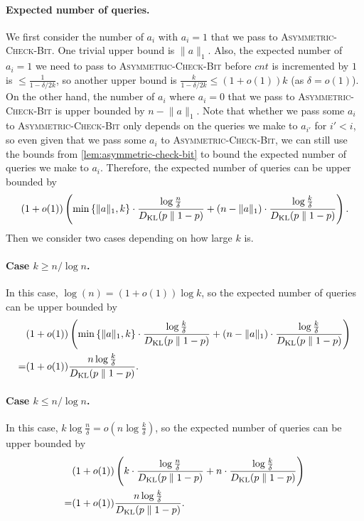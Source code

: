 \paragraph{Expected number of queries.} We first consider the number of $a_i$ with $a_i = 1$ that we pass to \textsc{Asymmetric-Check-Bit}. One trivial upper bound is $\lVert a \rVert_1$. Also, the expected number of $a_i = 1$ we need to pass to \textsc{Asymmetric-Check-Bit} before $cnt$ is incremented by $1$ is $\le \frac{1}{1-\delta/2k}$, so another upper bound is $\frac{k}{1-\delta/2k} \le (1+o(1)) k$ (as $\delta = o(1)$). On the other hand, the number of $a_i$ where $a_i = 0$ that we pass to \textsc{Asymmetric-Check-Bit} is upper bounded by $n - \lVert a \rVert_1$. Note that whether we pass some $a_i$ to \textsc{Asymmetric-Check-Bit} only depends on the queries we make to $a_{i'}$ for $i' < i$, so even given that we pass some $a_i$ to \textsc{Asymmetric-Check-Bit}, we can still use the bounds from \cref{lem:asymmetric-check-bit} to bound the expected number of queries we make to $a_i$. Therefore, the expected number of queries can be upper bounded by
\[
(1+o(1)) \left(\min\left\{\lVert a \rVert_1, k\right\} \cdot  \frac{\log\frac{n}{\delta}}{D_{\operatorname{\mathrm{KL}}}(p \parallel 1-p)} + (n - \lVert a \rVert_1) \cdot \frac{\log \frac{k}{\delta}}{D_{\operatorname{\mathrm{KL}}}(p \parallel 1-p)}\right).
\]
Then we consider two cases depending on how large $k$ is.

\paragraph{Case $k \ge n/\log n$.}
  In this case, $\log(n) = (1+o(1)) \log k$, so the expected number of queries can be upper bounded by
  \begin{align*}
& (1+o(1)) \left(\min\left\{\lVert a \rVert_1, k\right\} \cdot  \frac{\log \frac{k}{\delta}}{D_{\operatorname{\mathrm{KL}}}(p \parallel 1-p)} + (n - \lVert a \rVert_1) \cdot \frac{\log \frac{k}{\delta}}{D_{\operatorname{\mathrm{KL}}}(p \parallel 1-p)}\right) \\
= & (1+o(1)) \frac{n \log \frac{k}{\delta}}{D_{\operatorname{\mathrm{KL}}}(p \parallel 1-p)}.
\end{align*}

\paragraph{Case $k \le n/\log n$.}
In this case, $k \log \frac{n}{\delta} = o(n \log \frac{k}{\delta})$, so the expected number of queries can be upper bounded by
\begin{align*}
& (1+o(1)) \left(k \cdot  \frac{\log\frac{n}{\delta}}{D_{\operatorname{\mathrm{KL}}}(p \parallel 1-p)} + n \cdot \frac{\log \frac{k}{\delta}}{D_{\operatorname{\mathrm{KL}}}(p \parallel 1-p)}\right) \\
= & (1+o(1)) \frac{n \log \frac{k}{\delta}}{D_{\operatorname{\mathrm{KL}}}(p \parallel 1-p)}.
\end{align*}




